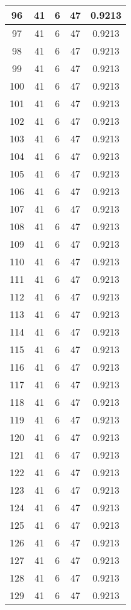 \documentclass[letterpaper, 12pt]{article}
\begin{document}
\begin{longtable}{|c|c|c|c|c|}
\hline
96 & 41 & 6 & 47 & 0.9213 \\
\hline
97 & 41 & 6 & 47 & 0.9213 \\
\hline
98 & 41 & 6 & 47 & 0.9213 \\
\hline
99 & 41 & 6 & 47 & 0.9213 \\
\hline
100 & 41 & 6 & 47 & 0.9213 \\
\hline
101 & 41 & 6 & 47 & 0.9213 \\
\hline
102 & 41 & 6 & 47 & 0.9213 \\
\hline
103 & 41 & 6 & 47 & 0.9213 \\
\hline
104 & 41 & 6 & 47 & 0.9213 \\
\hline
105 & 41 & 6 & 47 & 0.9213 \\
\hline
106 & 41 & 6 & 47 & 0.9213 \\
\hline
107 & 41 & 6 & 47 & 0.9213 \\
\hline
108 & 41 & 6 & 47 & 0.9213 \\
\hline
109 & 41 & 6 & 47 & 0.9213 \\
\hline
110 & 41 & 6 & 47 & 0.9213 \\
\hline
111 & 41 & 6 & 47 & 0.9213 \\
\hline
112 & 41 & 6 & 47 & 0.9213 \\
\hline
113 & 41 & 6 & 47 & 0.9213 \\
\hline
114 & 41 & 6 & 47 & 0.9213 \\
\hline
115 & 41 & 6 & 47 & 0.9213 \\
\hline
116 & 41 & 6 & 47 & 0.9213 \\
\hline
117 & 41 & 6 & 47 & 0.9213 \\
\hline
118 & 41 & 6 & 47 & 0.9213 \\
\hline
119 & 41 & 6 & 47 & 0.9213 \\
\hline
120 & 41 & 6 & 47 & 0.9213 \\
\hline
121 & 41 & 6 & 47 & 0.9213 \\
\hline
122 & 41 & 6 & 47 & 0.9213 \\
\hline
123 & 41 & 6 & 47 & 0.9213 \\
\hline
124 & 41 & 6 & 47 & 0.9213 \\
\hline
125 & 41 & 6 & 47 & 0.9213 \\
\hline
126 & 41 & 6 & 47 & 0.9213 \\
\hline
127 & 41 & 6 & 47 & 0.9213 \\
\hline
128 & 41 & 6 & 47 & 0.9213 \\
\hline
129 & 41 & 6 & 47 & 0.9213 \\

\end{longtable}
\end{document}
